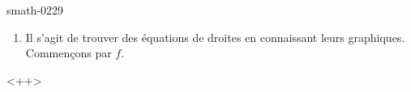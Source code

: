 
\begin{corrige}{smath-0229}


\begin{enumerate}
    \item
        Il s'agit de trouver des équations de droites en connaissant leurs graphiques. Commençons par \( f\).
\end{enumerate}
<++>

\end{corrige}
